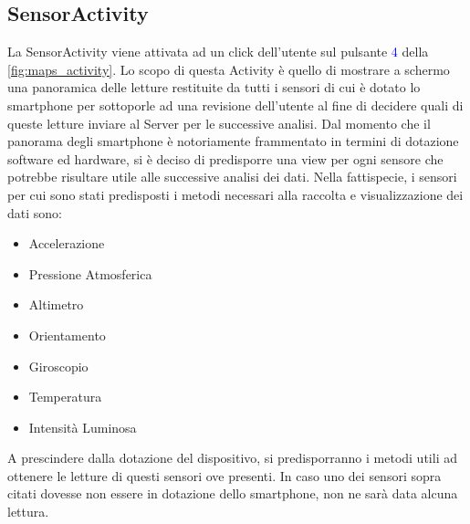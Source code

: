 \subsection{SensorActivity}
La SensorActivity viene attivata ad un click dell'utente sul pulsante \textcolor{blue}{4} della \autoref{fig:maps_activity}. Lo scopo di questa Activity è quello di mostrare a schermo una panoramica delle letture restituite da tutti i sensori di cui è dotato lo smartphone per sottoporle ad una revisione dell'utente al fine di decidere quali di queste letture inviare al Server per le successive analisi. 
Dal momento che il panorama degli smartphone è notoriamente frammentato in termini di dotazione software ed hardware, si è deciso di predisporre una view per ogni sensore che potrebbe risultare utile alle successive analisi dei dati. Nella fattispecie, i sensori per cui sono stati predisposti i metodi necessari alla raccolta e visualizzazione dei dati sono:
\begin{itemize}
	\item Accelerazione
	\item Pressione Atmosferica
	\item Altimetro
	\item Orientamento
	\item Giroscopio
	\item Temperatura
	\item Intensità Luminosa
\end{itemize}
A prescindere dalla dotazione del dispositivo, si predisporranno i metodi utili ad ottenere le letture di questi sensori ove presenti. In caso uno dei sensori sopra citati dovesse non essere in dotazione dello smartphone, non ne sarà data alcuna lettura.
